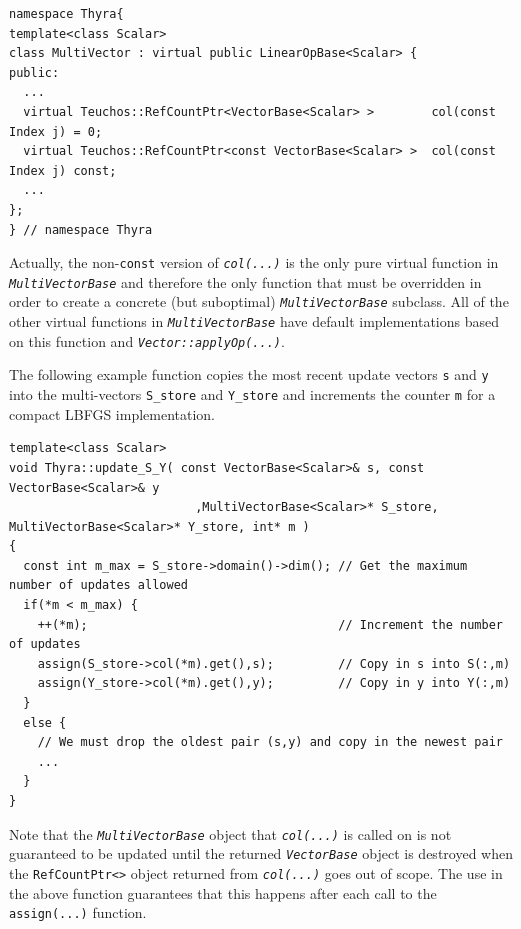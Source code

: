 \documentclass[pdf,ps2pdf,11pt]{SANDreport}
\begin{document}
{\scriptsize\begin{verbatim}
namespace Thyra{
template<class Scalar>
class MultiVector : virtual public LinearOpBase<Scalar> {
public:
  ...
  virtual Teuchos::RefCountPtr<VectorBase<Scalar> >        col(const Index j) = 0;
  virtual Teuchos::RefCountPtr<const VectorBase<Scalar> >  col(const Index j) const;
  ...
};
} // namespace Thyra
\end{verbatim}}

{}\noindent{}Actually, the non-\texttt{const} version of
{}\texttt{\textit{col(...)}}  is the only pure virtual function in
{}\texttt{\textit{Multi\-Vector\-Base}} and therefore the only function that
must be overridden in order to create a concrete (but suboptimal)
{}\texttt{\textit{Multi\-Vector\-Base}} subclass.  All of the other virtual
functions in {}\texttt{\textit{Multi\-Vector\-Base}} have default
implementations based on this function and
{}\texttt{\textit{Vector\-::applyOp(\-...)}}.

The following example function copies the most recent update vectors
{}\texttt{s} and {}\texttt{y} into the multi-vectors
{}\texttt{S\_store} and {}\texttt{Y\_store} and increments the counter
{}\texttt{m} for a compact LBFGS implementation.

{\scriptsize\begin{verbatim}
template<class Scalar>
void Thyra::update_S_Y( const VectorBase<Scalar>& s, const VectorBase<Scalar>& y
                          ,MultiVectorBase<Scalar>* S_store, MultiVectorBase<Scalar>* Y_store, int* m )
{
  const int m_max = S_store->domain()->dim(); // Get the maximum number of updates allowed
  if(*m < m_max) {
    ++(*m);                                   // Increment the number of updates
    assign(S_store->col(*m).get(),s);         // Copy in s into S(:,m)         
    assign(Y_store->col(*m).get(),y);         // Copy in y into Y(:,m)
  }
  else {
    // We must drop the oldest pair (s,y) and copy in the newest pair
    ...
  }
}
\end{verbatim}}

{}\noindent{}Note that the {}\texttt{\textit{Multi\-Vector\-Base}} object
that {}\texttt{\textit{col(...)}} is called on is not guaranteed to be
updated until the returned {}\texttt{\textit{Vector\-Base}} object is
destroyed when the {}\texttt{RefCountPtr<>} object returned from
{}\texttt{\textit{col(...)}} goes out of scope.  The use in the above
function guarantees that this happens after each call to the
{}\texttt{assign(...)} function.

%
\end{document}
